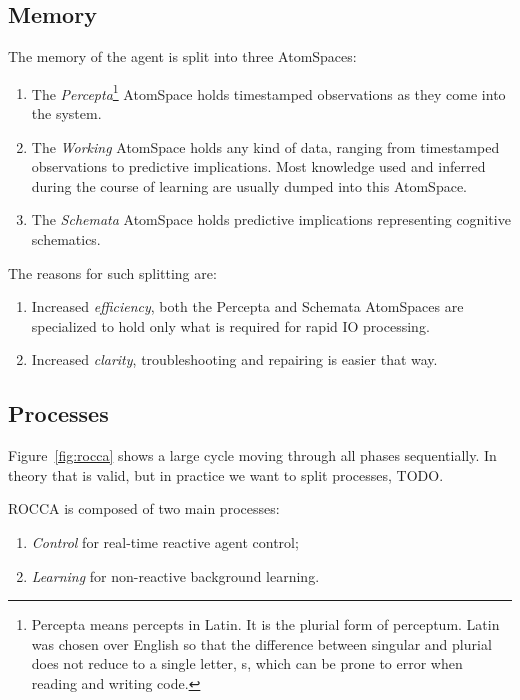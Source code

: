 \documentclass[runningheads]{llncs}
\begin{document}
\subsection{Memory}

The memory of the agent is split into three AtomSpaces:
\begin{enumerate}
\item The \emph{Percepta}\footnote{Percepta means percepts in Latin.
    It is the plurial form of perceptum.  Latin was chosen over
    English so that the difference between singular and plurial does
    not reduce to a single letter, s, which can be prone to error when
    reading and writing code.}  AtomSpace holds timestamped
  observations as they come into the system.
\item The \emph{Working} AtomSpace holds any kind of data, ranging
  from timestamped observations to predictive implications.  Most
  knowledge used and inferred during the course of learning are
  usually dumped into this AtomSpace.
\item The \emph{Schemata} AtomSpace holds predictive implications
  representing cognitive schematics.
\end{enumerate}
The reasons for such splitting are:
\begin{enumerate}
\item Increased \emph{efficiency}, both the Percepta and Schemata
  AtomSpaces are specialized to hold only what is required for rapid
  IO processing.
\item Increased \emph{clarity}, troubleshooting and repairing is
  easier that way.
\end{enumerate}

\subsection{Processes}

Figure~\ref{fig:rocca} shows a large cycle moving through all phases
sequentially.  In theory that is valid, but in practice we want to
split processes, TODO.

ROCCA is composed of two main processes:
\begin{enumerate}
\item \emph{Control} for real-time reactive agent control;
\item \emph{Learning} for non-reactive background learning.
\end{enumerate}
\end{document}
